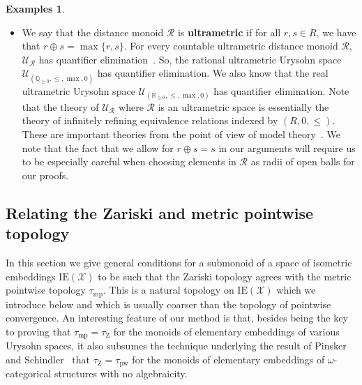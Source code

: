 \documentclass{article}
\theoremstyle{remark}
\theoremstyle{definition}
\newtheorem{examples}[theorem]{Examples}
\newcommand{\U}[0]{\mathbb{U}}
\renewcommand{\U}[0]{\mathcal{U}}
\newcommand{\pw}[0]{\tau_{\mathrm{pw}}}
\newcommand{\zar}[0]{\tau_{\mathrm{Z}}}
\newcommand{\mpw}[0]{\tau_{\mathrm{mp}}}
\renewcommand\leq{\leqslant}
\renewcommand\geq{\geqslant}
\newcommand{\rr}[0]{\mathcal{R}}
\newcommand{\ie}[0]{\mathrm{IE}}
\begin{document}
{{{{{\begin{examples}
\begin{itemize}
\item We say that the distance monoid $\rr$ is \textbf{ultrametric} if for all $r,s\in R$, we have that $r\oplus s=\max\{r,s\}$. For every countable ultrametric distance monoid $\rr$, $\U_{\rr}$ has quantifier elimination~\cite[Proposition 2.9.4]{con15}. {So, the rational ultrametric Urysohn space $\U_{(\mathbb{Q}_{\geq 0}, \leq,  \max,0)}$ has quantifier elimination.}
 {We also know that the real ultrametric Urysohn} space {$\U_{(\mathbb{R}_{\geq 0}, \leq, \max,0)}$} has quantifier elimination.  Note that the theory of $\U_{\rr}$ where $\rr$ is an ultrametric space is essentially the theory of infinitely refining equivalence relations indexed by $(R, 0, \leq)$. These are important theories from the point of view of model theory~\cite{baldwin2017fundamentals}. {We note that the fact that we allow for $r\oplus s=s$ in our arguments will require us to be especially careful when choosing elements in $\rr$ as radii of open balls for our proofs.}
\end{itemize}  
\end{examples}









\subsection{Relating the Zariski and metric pointwise topology}\label{sub:relating zar and met}

In this section we give general conditions for a 
{submonoid}
of a space of isometric embeddings $\ie(\mathcal{X})$ to be such that the Zariski topology agrees with the metric pointwise topology $\mpw$. 
This is a natural topology on $\ie(\mathcal{X})$ which we introduce below and which is usually coarser than the topology of pointwise convergence. An interesting feature of our method is that, {besides} being the key to proving that $\mpw=\zar$ for the monoids of elementary embeddings of various Urysohn spaces, it also subsumes the technique underlying the result of Pinsker and Schindler~\cite{pinskerschindler} that $\zar=\pw$ for the monoids of elementary embeddings of $\omega$-categorical structures with no algebraicity. 



}}}}}
\end{document}
